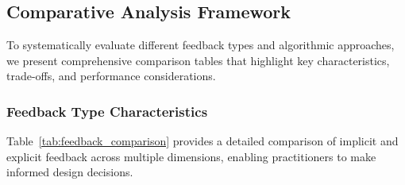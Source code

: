 \subsection{Comparative Analysis Framework}

To systematically evaluate different feedback types and algorithmic approaches, we present comprehensive comparison tables that highlight key characteristics, trade-offs, and performance considerations.

\subsubsection{Feedback Type Characteristics}
Table~\ref{tab:feedback_comparison} provides a detailed comparison of implicit and explicit feedback across multiple dimensions, enabling practitioners to make informed design decisions.

